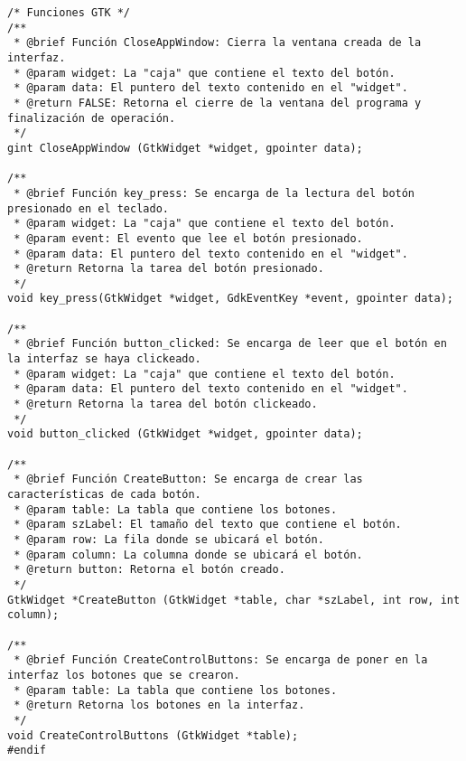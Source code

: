 \begin{lstlisting}
/* Funciones GTK */
/**
 * @brief Función CloseAppWindow: Cierra la ventana creada de la interfaz.
 * @param widget: La "caja" que contiene el texto del botón.
 * @param data: El puntero del texto contenido en el "widget".
 * @return FALSE: Retorna el cierre de la ventana del programa y finalización de operación.
 */
gint CloseAppWindow (GtkWidget *widget, gpointer data);

/**
 * @brief Función key_press: Se encarga de la lectura del botón presionado en el teclado.
 * @param widget: La "caja" que contiene el texto del botón.
 * @param event: El evento que lee el botón presionado.
 * @param data: El puntero del texto contenido en el "widget".
 * @return Retorna la tarea del botón presionado.
 */
void key_press(GtkWidget *widget, GdkEventKey *event, gpointer data);

/**
 * @brief Función button_clicked: Se encarga de leer que el botón en la interfaz se haya clickeado.
 * @param widget: La "caja" que contiene el texto del botón.
 * @param data: El puntero del texto contenido en el "widget".
 * @return Retorna la tarea del botón clickeado.
 */
void button_clicked (GtkWidget *widget, gpointer data);

/**
 * @brief Función CreateButton: Se encarga de crear las características de cada botón.
 * @param table: La tabla que contiene los botones.
 * @param szLabel: El tamaño del texto que contiene el botón.
 * @param row: La fila donde se ubicará el botón.
 * @param column: La columna donde se ubicará el botón.
 * @return button: Retorna el botón creado.
 */
GtkWidget *CreateButton (GtkWidget *table, char *szLabel, int row, int column);

/**
 * @brief Función CreateControlButtons: Se encarga de poner en la interfaz los botones que se crearon.
 * @param table: La tabla que contiene los botones.
 * @return Retorna los botones en la interfaz.
 */
void CreateControlButtons (GtkWidget *table);
#endif


\end{lstlisting}
\newpage

